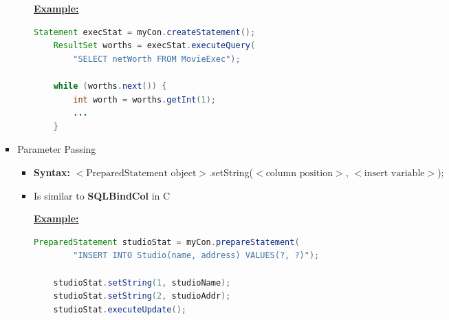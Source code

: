\documentclass[12pt]{article}
\begin{document}
\begin{enumerate}[1.]
\begin{enumerate}[a)]
\begin{itemize}
\begin{itemize}
\begin{itemize}
                    \bigskip

                    \underline{\textbf{Example:}}

                    \bigskip

    \begin{lstlisting}[language=JAVA]
    Statement execStat = myCon.createStatement();
    ResultSet worths = execStat.executeQuery(
        "SELECT netWorth FROM MovieExec");

    while (worths.next()) {
        int worth = worths.getInt(1);
        ...
    }
    \end{lstlisting}

                \end{itemize}
                \item Parameter Passing
                \begin{itemize}
                    \item \textbf{Syntax:} $<\text{PreparedStatement object}>$.setString($<\text{column position}>$, $<\text{insert variable}>$);
                    \item Is similar to \textbf{SQLBindCol} in C

                    \bigskip

                    \underline{\textbf{Example:}}

                    \bigskip

    \begin{lstlisting}[language=JAVA]
    PreparedStatement studioStat = myCon.prepareStatement(
        "INSERT INTO Studio(name, address) VALUES(?, ?)");

    studioStat.setString(1, studioName);
    studioStat.setString(2, studioAddr);
    studioStat.executeUpdate();
    \end{lstlisting}
                \end{itemize}
            \end{itemize}
        \end{itemize}
    \end{enumerate}

\end{enumerate}
\end{document}
